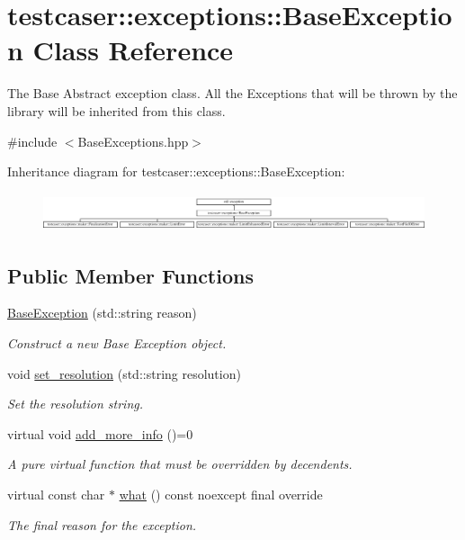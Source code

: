 \hypertarget{classtestcaser_1_1exceptions_1_1BaseException}{}\section{testcaser\+:\+:exceptions\+:\+:Base\+Exception Class Reference}
\label{classtestcaser_1_1exceptions_1_1BaseException}


The Base Abstract exception class. All the Exceptions that will be thrown by the library will be inherited from this class.  




{\ttfamily \#include $<$Base\+Exceptions.\+hpp$>$}

Inheritance diagram for testcaser\+:\+:exceptions\+:\+:Base\+Exception\+:\begin{figure}[H]
\begin{center}
\leavevmode
\includegraphics[height=1.135135cm]{classtestcaser_1_1exceptions_1_1BaseException}
\end{center}
\end{figure}
\subsection*{Public Member Functions}
\begin{DoxyCompactItemize}
\item 
\mbox{\hyperlink{classtestcaser_1_1exceptions_1_1BaseException_a70b5f42e6197e2600f7163f843060af2}{Base\+Exception}} (std\+::string reason)
\begin{DoxyCompactList}\small\item\em Construct a new Base Exception object. \end{DoxyCompactList}\item 
void \mbox{\hyperlink{classtestcaser_1_1exceptions_1_1BaseException_a92c371d40b0f3dbaa7de968ea67e5211}{set\+\_\+resolution}} (std\+::string resolution)
\begin{DoxyCompactList}\small\item\em Set the resolution string. \end{DoxyCompactList}\item 
virtual void \mbox{\hyperlink{classtestcaser_1_1exceptions_1_1BaseException_ad607ea04e2cb4ad9b8d0e2e6b6734f2f}{add\+\_\+more\+\_\+info}} ()=0
\begin{DoxyCompactList}\small\item\em A pure virtual function that must be overridden by decendents. \end{DoxyCompactList}\item 
virtual const char $\ast$ \mbox{\hyperlink{classtestcaser_1_1exceptions_1_1BaseException_a76d41683a93c7c45cd446ee161344f05}{what}} () const noexcept final override
\begin{DoxyCompactList}\small\item\em The final reason for the exception. \end{DoxyCompactList}\end{DoxyCompactItemize}
